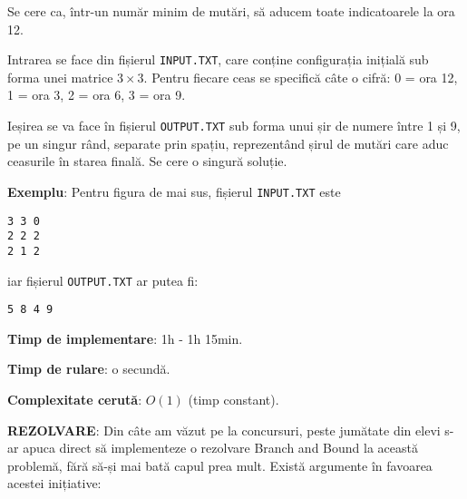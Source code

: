 Se cere ca, într-un număr minim de mutări, să aducem toate indicatoarele la
ora 12.

Intrarea se face din fișierul {\tt INPUT.TXT}, care conține configurația
inițială sub forma unei matrice $3 \times 3$. Pentru fiecare ceas se specifică
câte o cifră: 0 = ora 12, 1 = ora 3, 2 = ora 6, 3 = ora 9.

Ieșirea se va face în fișierul {\tt OUTPUT.TXT} sub forma unui șir de numere
între 1 și 9, pe un singur rând, separate prin spațiu, reprezentând șirul de
mutări care aduc ceasurile în starea finală. Se cere o singură soluție.

{\bf Exemplu}: Pentru figura de mai sus, fișierul {\tt INPUT.TXT} este

\begin{verbatim}
3 3 0
2 2 2
2 1 2
\end{verbatim}

iar fișierul {\tt OUTPUT.TXT} ar putea fi:

\begin{verbatim}
5 8 4 9
\end{verbatim}

{\bf Timp de implementare}: 1h - 1h 15min.

{\bf Timp de rulare}: o secundă.

{\bf Complexitate cerută}: $O(1)$ (timp constant).

{\bf REZOLVARE}: Din câte am văzut pe la concursuri, peste jumătate din elevi
s-ar apuca direct să implementeze o rezolvare Branch and Bound la această
problemă, fără să-și mai bată capul prea mult. Există argumente în favoarea
acestei inițiative:

